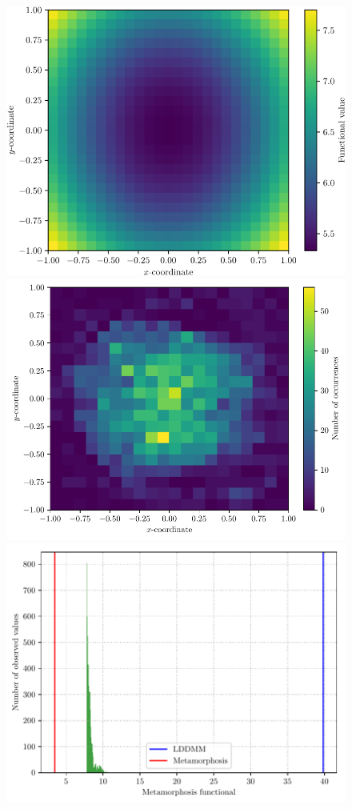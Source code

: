 \documentclass[runningheads]{llncs}
\begin{document}
\begin{figure}[h!]
\centering
\begin{minipage}{\textwidth}
  \centering
    \includegraphics[scale=.39]{density_criss_cross.pdf}
    \includegraphics[scale=.38]{centroid_heat_criss_cross.pdf}\\[0.23cm]
    \includegraphics[scale=.33]{functional_histogram_criss_cross.pdf}

\end{minipage}
\end{figure}
\end{document}
